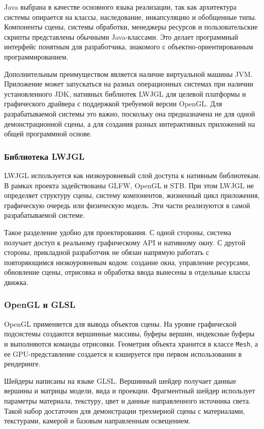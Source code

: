 Java выбрана в качестве основного языка реализации, так как архитектура системы
опирается на классы, наследование, инкапсуляцию и обобщенные типы. Компоненты
сцены, системы обработки, менеджеры ресурсов и пользовательские скрипты
представлены обычными Java-классами. Это делает программный интерфейс
понятным для разработчика, знакомого с объектно-ориентированным
программированием.

Дополнительным преимуществом является наличие виртуальной машины JVM.
Приложение может запускаться на разных операционных системах при наличии
установленного JDK, нативных библиотек LWJGL для целевой платформы и
графического драйвера с поддержкой требуемой версии OpenGL. Для разрабатываемой
системы это важно, поскольку она предназначена не для одной демонстрационной
сцены, а для создания разных интерактивных приложений на общей программной
основе.

\subsubsection{Библиотека LWJGL}

LWJGL используется как низкоуровневый слой доступа к нативным библиотекам.
В рамках проекта задействованы GLFW, OpenGL и STB. При этом LWJGL не
определяет структуру сцены, систему компонентов, жизненный цикл приложения,
графическую очередь или физическую модель. Эти части реализуются в самой
разрабатываемой системе.

Такое разделение удобно для проектирования. С одной стороны, система получает
доступ к реальному графическому API и нативному окну. С другой стороны,
прикладной разработчик не обязан напрямую работать с повторяющимся
низкоуровневым кодом: создание окна, управление ресурсами, обновление сцены,
отрисовка и обработка ввода вынесены в отдельные классы движка.

\subsubsection{OpenGL и GLSL}

OpenGL применяется для вывода объектов сцены. На уровне графической
подсистемы создаются вершинные массивы, буферы вершин, индексные буферы и
выполняются команды отрисовки. Геометрия объекта хранится в классе
\texttt{Mesh}, а ее GPU-представление создается и кэшируется при первом
использовании в рендеринге.

Шейдеры написаны на языке GLSL. Вершинный шейдер получает данные вершины
и матрицы модели, вида и проекции. Фрагментный шейдер использует параметры
материала, текстуру, цвет и данные направленного источника света. Такой набор
достаточен для демонстрации трехмерной сцены с материалами, текстурами,
камерой и базовым направленным освещением.

